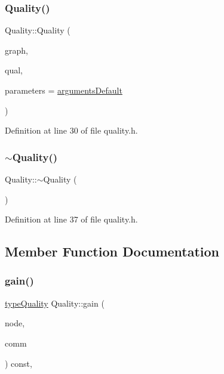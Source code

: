 \subsubsection{\texorpdfstring{Quality()}{Quality()}}
{\footnotesize\ttfamily Quality\+::\+Quality (\begin{DoxyParamCaption}\item[{\hyperlink{classGraphUndirectedGroupable}{Graph\+Undirected\+Groupable} \&}]{graph,  }\item[{const \hyperlink{classQuality_ada8fae04627fbcaa8d41a1d42ae124df}{Q\+U\+A\+L\+I\+TY} \&}]{qual,  }\item[{const \hyperlink{structProgramParameters}{Program\+Parameters} \&}]{parameters = {\ttfamily \hyperlink{program_8h_ae2d819404495f80f31db7676c1329d19}{arguments\+Default}} }\end{DoxyParamCaption})\hspace{0.3cm}{\ttfamily [inline]}}



Definition at line 30 of file quality.\+h.

\mbox{\label{classQuality_af324bc7935b5f9fb997dc6de32e0bd78}} 
\subsubsection{\texorpdfstring{$\sim$\+Quality()}{~Quality()}}
{\footnotesize\ttfamily Quality\+::$\sim$\+Quality (\begin{DoxyParamCaption}{ }\end{DoxyParamCaption})\hspace{0.3cm}{\ttfamily [inline]}}



Definition at line 37 of file quality.\+h.



\subsection{Member Function Documentation}
\mbox{\label{classQuality_a1754dc190ca3204035d873c4d4b580cd}} 
\subsubsection{\texorpdfstring{gain()}{gain()}}
{\footnotesize\ttfamily \hyperlink{qualityInterface_8h_a15a3ec6041e6e02d00d2eff22c20fd94}{type\+Quality} Quality\+::gain (\begin{DoxyParamCaption}\item[{const \hyperlink{edge_8h_a5fbd20c46956d479cb10afc9855223f6}{type\+Vertex} \&}]{node,  }\item[{const \hyperlink{graphUndirectedGroupable_8h_a914da95c9ea7f14f4b7f875c36818556}{type\+Community} \&}]{comm }\end{DoxyParamCaption}) const\hspace{0.3cm}{\ttfamily [inline]}, {\ttfamily [virtual]}}

